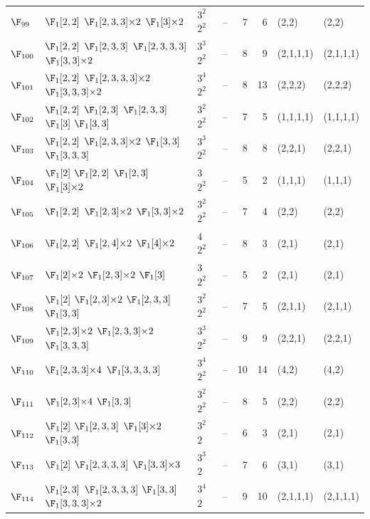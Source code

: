 \begin{landscape}
{\begin{longtable}{@{}l p{8.2cm} l l r r l l@{}}
$\F_{99}$ & $\F_{1}[2,2]$\; $\F_{1}[2,3,3]{\times}2$\; $\F_{1}[3]{\times}2$ & $3^{2}$\,$2^{2}$ & -- & 7 & 6 & (2,2) & (2,2) \\
$\F_{100}$ & $\F_{1}[2,2]$\; $\F_{1}[2,3,3]$\; $\F_{1}[2,3,3,3]$\; $\F_{1}[3,3]{\times}2$ & $3^{3}$\,$2^{2}$ & -- & 8 & 9 & (2,1,1,1) & (2,1,1,1) \\
$\F_{101}$ & $\F_{1}[2,2]$\; $\F_{1}[2,3,3,3]{\times}2$\; $\F_{1}[3,3,3]{\times}2$ & $3^{4}$\,$2^{2}$ & -- & 8 & 13 & (2,2,2) & (2,2,2) \\
$\F_{102}$ & $\F_{1}[2,2]$\; $\F_{1}[2,3]$\; $\F_{1}[2,3,3]$\; $\F_{1}[3]$\; $\F_{1}[3,3]$ & $3^{2}$\,$2^{2}$ & -- & 7 & 5 & (1,1,1,1) & (1,1,1,1) \\
$\F_{103}$ & $\F_{1}[2,2]$\; $\F_{1}[2,3,3]{\times}2$\; $\F_{1}[3,3]$\; $\F_{1}[3,3,3]$ & $3^{3}$\,$2^{2}$ & -- & 8 & 8 & (2,2,1) & (2,2,1) \\
$\F_{104}$ & $\F_{1}[2]$\; $\F_{1}[2,2]$\; $\F_{1}[2,3]$\; $\F_{1}[3]{\times}2$ & $3$\,$2^{2}$ & -- & 5 & 2 & (1,1,1) & (1,1,1) \\
$\F_{105}$ & $\F_{1}[2,2]$\; $\F_{1}[2,3]{\times}2$\; $\F_{1}[3,3]{\times}2$ & $3^{2}$\,$2^{2}$ & -- & 7 & 4 & (2,2) & (2,2) \\
$\F_{106}$ & $\F_{1}[2,2]$\; $\F_{1}[2,4]{\times}2$\; $\F_{1}[4]{\times}2$ & $4$\,$2^{2}$ & -- & 8 & 3 & (2,1) & (2,1) \\
$\F_{107}$ & $\F_{1}[2]{\times}2$\; $\F_{1}[2,3]{\times}2$\; $\F_{1}[3]$ & $3$\,$2^{2}$ & -- & 5 & 2 & (2,1) & (2,1) \\
$\F_{108}$ & $\F_{1}[2]$\; $\F_{1}[2,3]{\times}2$\; $\F_{1}[2,3,3]$\; $\F_{1}[3,3]$ & $3^{2}$\,$2^{2}$ & -- & 7 & 5 & (2,1,1) & (2,1,1) \\
$\F_{109}$ & $\F_{1}[2,3]{\times}2$\; $\F_{1}[2,3,3]{\times}2$\; $\F_{1}[3,3,3]$ & $3^{3}$\,$2^{2}$ & -- & 9 & 9 & (2,2,1) & (2,2,1) \\
$\F_{110}$ & $\F_{1}[2,3,3]{\times}4$\; $\F_{1}[3,3,3,3]$ & $3^{4}$\,$2^{2}$ & -- & 10 & 14 & (4,2) & (4,2) \\
$\F_{111}$ & $\F_{1}[2,3]{\times}4$\; $\F_{1}[3,3]$ & $3^{2}$\,$2^{2}$ & -- & 8 & 5 & (2,2) & (2,2) \\
$\F_{112}$ & $\F_{1}[2]$\; $\F_{1}[2,3,3]$\; $\F_{1}[3]{\times}2$\; $\F_{1}[3,3]$ & $3^{2}$\,$2$ & -- & 6 & 3 & (2,1) & (2,1) \\
$\F_{113}$ & $\F_{1}[2]$\; $\F_{1}[2,3,3,3]$\; $\F_{1}[3,3]{\times}3$ & $3^{3}$\,$2$ & -- & 7 & 6 & (3,1) & (3,1) \\
$\F_{114}$ & $\F_{1}[2,3]$\; $\F_{1}[2,3,3,3]$\; $\F_{1}[3,3]$\; $\F_{1}[3,3,3]{\times}2$ & $3^{4}$\,$2$ & -- & 9 & 10 & (2,1,1,1) & (2,1,1,1) \\

\end{longtable}}
\end{landscape}
